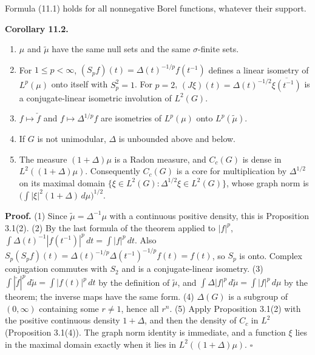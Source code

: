 \documentclass[
  english,
  11pt,
  a4paper,
]{article}
\providecommand{\tightlist}{%
  \setlength{\itemsep}{0pt}\setlength{\parskip}{0pt}}
\begin{document}
Formula (11.1) holds for all nonnegative Borel functions, whatever their
support.

\textbf{Corollary 11.2.}

\begin{enumerate}
\tightlist
\item
  \(\mu\) and \(\tilde\mu\) have the same null sets and the same
  \(\sigma\)-finite sets.
\item
  For \(1\leq p<\infty\), \((S_pf)(t)=\Delta(t)^{-1/p}f(t^{-1})\)
  defines a linear isometry of \(L^p(\mu)\) onto itself with
  \(S_p^2=1\). For \(p=2\),
  \((J\xi)(t)=\Delta(t)^{-1/2}\overline{\xi(t^{-1})}\) is a
  conjugate-linear isometric involution of \(L^2(G)\).
\item
  \(f\mapsto\check f\) and \(f\mapsto\Delta^{1/p}f\) are isometries of
  \(L^p(\mu)\) onto \(L^p(\tilde\mu)\).
\item
  If \(G\) is not unimodular, \(\Delta\) is unbounded above and below.
\item
  The measure \((1+\Delta)\mu\) is a Radon measure, and \(C_c(G)\) is
  dense in \(L^2((1+\Delta)\mu)\). Consequently \(C_c(G)\) is a core for
  multiplication by \(\Delta^{1/2}\) on its maximal domain
  \(\{\xi\in L^2(G):\Delta^{1/2}\xi\in L^2(G)\}\), whose graph norm is
  \(\big(\int|\xi|^2(1+\Delta)\,d\mu\big)^{1/2}\).
\end{enumerate}

\textbf{Proof.} (1) Since \(\tilde\mu=\Delta^{-1}\mu\) with a continuous
positive density, this is Proposition 3.1(2). (2) By the last formula of
the theorem applied to \(|f|^p\),
\(\int\Delta(t)^{-1}|f(t^{-1})|^p\,dt=\int|f|^p\,dt\). Also
\(S_p(S_pf)(t)=\Delta(t)^{-1/p}\Delta(t^{-1})^{-1/p}f(t)=f(t)\), so
\(S_p\) is onto. Complex conjugation commutes with \(S_2\) and is a
conjugate-linear isometry. (3)
\(\int|\check f|^p\,d\tilde\mu=\int|f(t)|^p\,dt\) by the definition of
\(\tilde\mu\), and \(\int\Delta|f|^p\,d\tilde\mu=\int|f|^p\,d\mu\) by
the theorem; the inverse maps have the same form. (4) \(\Delta(G)\) is a
subgroup of \((0,\infty)\) containing some \(r\neq1\), hence all
\(r^n\). (5) Apply Proposition 3.1(2) with the positive continuous
density \(1+\Delta\), and then the density of \(C_c\) in \(L^2\)
(Proposition 3.1(4)). The graph norm identity is immediate, and a
function \(\xi\) lies in the maximal domain exactly when it lies in
\(L^2((1+\Delta)\mu)\). \(\square\)
\end{document}
